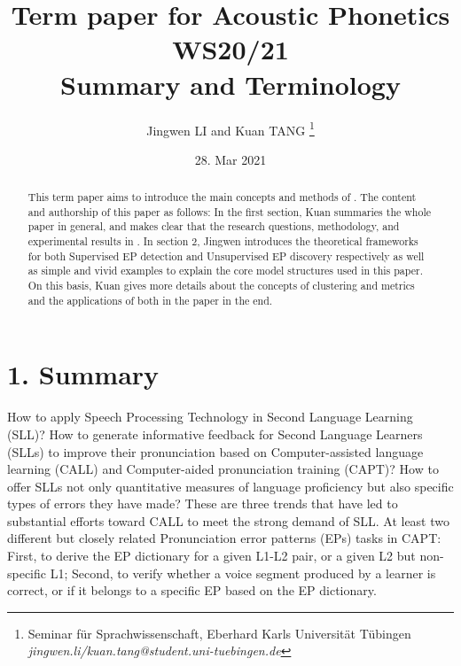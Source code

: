 \documentclass[nobib]{tufte-handout}
\title{{Term paper for Acoustic Phonetics WS20/21\\\cite{wang2015supervised} Summary and Terminology}}
\author{Jingwen LI and Kuan TANG
\thanks{
Seminar f\"ur Sprachwissenschaft, Eberhard Karls Universit\"at T\"ubingen \\
{\it{jingwen.li/kuan.tang@student.uni-tuebingen.de}}}}
\date{28. Mar 2021}
\begin{document}
\maketitle

\begin{abstract}
\noindent This term paper aims to introduce the main concepts and methods of \cite{wang2015supervised}. The content and authorship of this paper as follows: In the first section, Kuan summaries the whole paper in general, and makes clear that the research questions, methodology, and experimental results in \cite{wang2015supervised}. In section 2, Jingwen introduces the theoretical frameworks for both Supervised EP detection and Unsupervised EP discovery respectively as well as simple and vivid examples to explain the core model structures used in this paper. On this basis, Kuan gives more details about the concepts of clustering and metrics and the applications of both in the paper in the end.
\end{abstract}


\bigskip
\section{1. \textbf{Summary}}

How to apply Speech Processing Technology in Second Language Learning (SLL)? How to generate informative feedback for Second Language Learners (SLLs) to improve their pronunciation based on Computer-assisted language learning (CALL)  and Computer-aided pronunciation training (CAPT)? How to offer SLLs not only quantitative measures of language proficiency but also specific types of errors they have made? These are three trends that have led to substantial efforts toward CALL to meet the strong demand of SLL. At least two different but closely related Pronunciation error patterns (EPs) tasks in CAPT: First, to derive the EP dictionary for a given L1-L2 pair, or a given L2 but non-specific L1; Second, to verify whether a voice segment produced by a learner is correct, or if it belongs to a specific EP based on the EP dictionary. 
\end{document}
